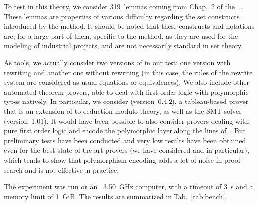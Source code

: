 To test \archsat{} in this theory, we consider 319~lemmas coming from Chap.~2 of
the \bbook{}~\cite{B-Book}. These lemmas are properties of various difficulty
regarding the set constructs introduced by the \bmth{} method. It should be
noted that these constructs and notations are, for a large part of them,
specific to the \bmth{} method, as they are used for the modeling of industrial
projects, and are not necessarily standard in set theory.

As tools, we actually consider two versions of \archsat{} in our test: one
version with rewriting and another one without rewriting (in this case, the
rules of the rewrite system are considered as usual equations or
equivalences). We also include other automated theorem provers, able to deal
with first order logic with polymorphic types natively. In particular, we
consider \zenm{} (version~0.4.2), a tableau-based prover that is an extension of
\zenon{} to deduction modulo theory, as well as the \altergo{} SMT solver
(version~1.01). It would have been possible to also consider provers dealing
with pure first order logic and encode the polymorphic layer along the lines
of~\cite{BA13}. But preliminary tests have been conducted and very low results
have been obtained even for the best state-of-the-art provers (we have
considered \e{} and \cvc{} in particular), which tends to show that polymorphism
encoding adds a lot of noise in proof search and is not effective in practice.

The experiment was run on an \intel{}~3.50~GHz computer, with a timeout of 3~s
and a memory limit of 1~GiB. The results are summarized in Tab.~\ref{tab:bench}.

\setlength{\tabcolsep}{3pt}
\renewcommand{\arraystretch}{1.2}


